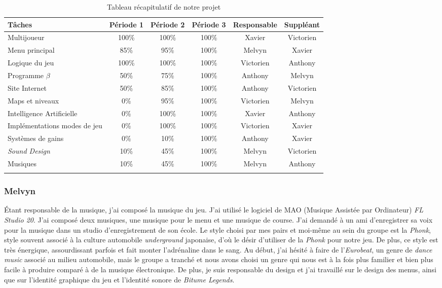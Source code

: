 \documentclass[a4paper,12pt]{article}
\newcommand{\btmlgs}{\textsl{Bitume Legends}}
\newcommand{\AI}{Intelligence Artificielle}
\begin{document}
    \renewcommand{\arraystretch}{1.2}
    \setlength{\LTleft}{-1cm plus 1 fill}
    \setlength{\LTright}{-1cm plus 1 fill}
    \begin{longtable}{| p{4.5cm} || c | c | c | c | c |}
    \hline
    Tâches & Période 1 & Période 2 & Période 3 & Responsable & Suppléant\\\hline\hline
    Multijoueur & 100\% & 100\% & 100\% & Xavier & Victorien \\\hline
    Menu principal & 85\% & 95\% & 100\% & Melvyn & Xavier \\\hline
    Logique du jeu & 100\% & 100\%  & 100\% & Victorien & Anthony\\\hline
    Programme \(\beta\) & 50\% & 75\% & 100\% & Anthony & Melvyn \\\hline
    Site Internet & 50\% & 85\%  & 100\% & Anthony & Victorien\\\hline
    Maps et niveaux & 0\% & 95\%  & 100\% & Victorien & Melvyn\\\hline
    \AI & 0\% & 100\%  & 100\% & Xavier & Anthony\\\hline
    Implémentations modes de jeu & 0\% & 100\%  & 100\% & Victorien & Xavier\\\hline
    Systèmes de gains & 0\% & 10\%  & 100\% & Anthony & Xavier\\\hline
    \textit{Sound Design} & 10\% & 45\% & 100\% & Melvyn & Victorien\\\hline
    Musiques & 10\% & 45\%  & 100\% & Melvyn & Anthony \\\hline
    \caption{Tableau récapitulatif de notre projet}
\end{longtable}

    \subsubsection{Melvyn}
        Étant responsable de la musique, j'ai composé la 
        musique du jeu. J'ai utilisé le logiciel de MAO (Musique Assistée par Ordinateur) 
        \textsl{FL Studio 20}. J'ai composé deux musiques, une musique pour le menu et 
        une musique de course. J'ai demandé à un ami d'enregistrer sa voix pour la musique
        dans un studio d'enregistrement de son école. Le style choisi par mes pairs et moi-même
        au sein du groupe est la \textsl{Phonk}, style souvent associé à la culture automobile
        \textit{underground} japonaise, d'où le désir d'utiliser de la \textsl{Phonk} pour notre jeu. 
        De plus, ce style est très énergique, assourdissant parfois et fait monter l'adrénaline
        dans le sang. Au début, j'ai hésité à faire de l'\textit{Eurobeat}, un genre de \textit{dance music}
        associé au milieu automobile, mais le groupe a tranché et nous avons choisi un genre qui
        nous est à la fois plus familier et bien plus facile à produire comparé à de la musique
        électronique. De plus, je suis responsable du design et j'ai travaillé sur le design des
        menus, ainsi que sur l'identité graphique du jeu et l'identité sonore de \btmlgs.
\end{document}
